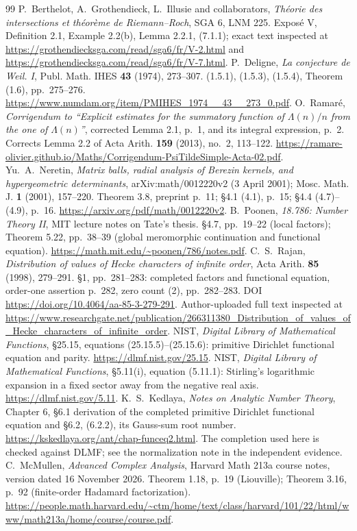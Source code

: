 \begin{thebibliography}{99}
 P.~Berthelot, A.~Grothendieck, L.~Illusie and collaborators, \emph{Th\'eorie des intersections et th\'eor\`eme de Riemann--Roch}, SGA 6, LNM 225. Expos\'e V, Definition 2.1, Example 2.2(b), Lemma 2.2.1, (7.1.1); exact text inspected at \url{https://grothendiecksga.com/read/sga6/fr/V-2.html} and \url{https://grothendiecksga.com/read/sga6/fr/V-7.html}.
 P.~Deligne, \emph{La conjecture de Weil. I}, Publ. Math. IHES \textbf{43} (1974), 273--307. (1.5.1), (1.5.3), (1.5.4), Theorem (1.6), pp.~275--276. \url{https://www.numdam.org/item/PMIHES_1974__43__273_0.pdf}.
 O.~Ramar\'e, \emph{Corrigendum to ``Explicit estimates for the summatory function of $\Lambda(n)/n$ from the one of $\Lambda(n)$''}, corrected Lemma 2.1, p.~1, and its integral expression, p.~2. Corrects Lemma 2.2 of Acta Arith. \textbf{159} (2013), no.~2, 113--122. \url{https://ramare-olivier.github.io/Maths/Corrigendum-PsiTildeSimple-Acta-02.pdf}.
 Yu.~A.~Neretin, \emph{Matrix balls, radial analysis of Berezin kernels, and hypergeometric determinants}, arXiv:math/0012220v2 (3 April 2001); Mosc. Math. J. \textbf{1} (2001), 157--220. Theorem 3.8, preprint p.~11; \S4.1 (4.1), p.~15; \S4.4 (4.7)--(4.9), p.~16. \url{https://arxiv.org/pdf/math/0012220v2}.
 B.~Poonen, \emph{18.786: Number Theory II}, MIT lecture notes on Tate's thesis. \S4.7, pp.~19--22 (local factors); Theorem 5.22, pp.~38--39 (global meromorphic continuation and functional equation). \url{https://math.mit.edu/~poonen/786/notes.pdf}.
 C.~S.~Rajan, \emph{Distribution of values of Hecke characters of infinite order}, Acta Arith. \textbf{85} (1998), 279--291. \S1, pp.~281--283: completed factors and functional equation, order-one assertion p.~282, zero count (2), pp.~282--283. DOI \url{https://doi.org/10.4064/aa-85-3-279-291}. Author-uploaded full text inspected at \url{https://www.researchgate.net/publication/266311380_Distribution_of_values_of_Hecke_characters_of_infinite_order}.
 NIST, \emph{Digital Library of Mathematical Functions}, \S25.15, equations (25.15.5)--(25.15.6): primitive Dirichlet functional equation and parity. \url{https://dlmf.nist.gov/25.15}.
 NIST, \emph{Digital Library of Mathematical Functions}, \S5.11(i), equation (5.11.1): Stirling's logarithmic expansion in a fixed sector away from the negative real axis. \url{https://dlmf.nist.gov/5.11}.
 K.~S.~Kedlaya, \emph{Notes on Analytic Number Theory}, Chapter 6, \S6.1 derivation of the completed primitive Dirichlet functional equation and \S6.2, (6.2.2), its Gauss-sum root number. \url{https://kskedlaya.org/ant/chap-funceq2.html}. The completion used here is checked against DLMF; see the normalization note in the independent evidence.
 C.~McMullen, \emph{Advanced Complex Analysis}, Harvard Math 213a course notes, version dated 16 November 2026. Theorem 1.18, p.~19 (Liouville); Theorem 3.16, p.~92 (finite-order Hadamard factorization). \url{https://people.math.harvard.edu/~ctm/home/text/class/harvard/101/22/html/www/math213a/home/course/course.pdf}.
\end{thebibliography}

